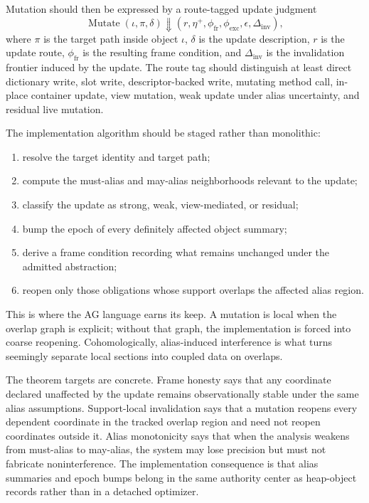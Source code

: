 \documentclass[11pt]{report}
\begin{document}
Mutation should then be expressed by a route-tagged update judgment
\[
\operatorname{Mutate}(\iota,\pi,\delta) \Downarrow (r,\eta^{+},\phi_{\mathrm{fr}},\phi_{\mathrm{exc}},\epsilon,\Delta_{\mathrm{inv}}),
\]
where $\pi$ is the target path inside object $\iota$, $\delta$ is the update description, $r$ is the update route, $\phi_{\mathrm{fr}}$ is the resulting frame condition, and $\Delta_{\mathrm{inv}}$ is the invalidation frontier induced by the update. The route tag should distinguish at least direct dictionary write, slot write, descriptor-backed write, mutating method call, in-place container update, view mutation, weak update under alias uncertainty, and residual live mutation.

The implementation algorithm should be staged rather than monolithic:
\begin{enumerate}
\item resolve the target identity and target path;
\item compute the must-alias and may-alias neighborhoods relevant to the update;
\item classify the update as strong, weak, view-mediated, or residual;
\item bump the epoch of every definitely affected object summary;
\item derive a frame condition recording what remains unchanged under the admitted abstraction;
\item reopen only those obligations whose support overlaps the affected alias region.
\end{enumerate}
This is where the AG language earns its keep. A mutation is local when the overlap graph is explicit; without that graph, the implementation is forced into coarse reopening. Cohomologically, alias-induced interference is what turns seemingly separate local sections into coupled data on overlaps.

The theorem targets are concrete. Frame honesty says that any coordinate declared unaffected by the update remains observationally stable under the same alias assumptions. Support-local invalidation says that a mutation reopens every dependent coordinate in the tracked overlap region and need not reopen coordinates outside it. Alias monotonicity says that when the analysis weakens from must-alias to may-alias, the system may lose precision but must not fabricate noninterference. The implementation consequence is that alias summaries and epoch bumps belong in the same authority center as heap-object records rather than in a detached optimizer.
\end{document}
